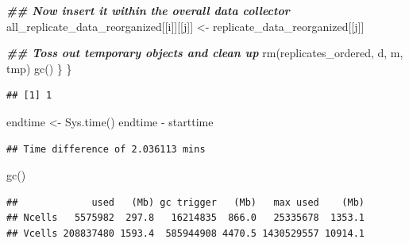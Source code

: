 \documentclass[
]{book}
\newenvironment{Shaded}{\begin{snugshade}}{\end{snugshade}}
\newcommand{\CommentTok}[1]{\textcolor[rgb]{0.56,0.35,0.01}{\textit{#1}}}
\newcommand{\ControlFlowTok}[1]{\textcolor[rgb]{0.13,0.29,0.53}{\textbf{#1}}}
\newcommand{\DecValTok}[1]{\textcolor[rgb]{0.00,0.00,0.81}{#1}}
\newcommand{\DocumentationTok}[1]{\textcolor[rgb]{0.56,0.35,0.01}{\textbf{\textit{#1}}}}
\newcommand{\FunctionTok}[1]{\textcolor[rgb]{0.00,0.00,0.00}{#1}}
\newcommand{\NormalTok}[1]{#1}
\newcommand{\OtherTok}[1]{\textcolor[rgb]{0.56,0.35,0.01}{#1}}
\newcommand{\SpecialCharTok}[1]{\textcolor[rgb]{0.00,0.00,0.00}{#1}}
\begin{document}
\begin{Shaded}
\begin{Highlighting}[]
    \DocumentationTok{\#\# Now insert it within the overall data collector}
\NormalTok{    all\_replicate\_data\_reorganized[[i]][[j]] }\OtherTok{\textless{}{-}}
\NormalTok{      replicate\_data\_reorganized[[j]]}

    \DocumentationTok{\#\# Toss out temporary objects and clean up}
    \FunctionTok{rm}\NormalTok{(replicates\_ordered, d, m, tmp)}
    \FunctionTok{gc}\NormalTok{()}
\NormalTok{  \}}
\NormalTok{\}}
\end{Highlighting}
\end{Shaded}

\begin{verbatim}
## [1] 1
\end{verbatim}

\begin{Shaded}
\begin{Highlighting}[]
\NormalTok{endtime }\OtherTok{\textless{}{-}} \FunctionTok{Sys.time}\NormalTok{()}
\NormalTok{endtime }\SpecialCharTok{{-}}\NormalTok{ starttime}
\end{Highlighting}
\end{Shaded}

\begin{verbatim}
## Time difference of 2.036113 mins
\end{verbatim}

\begin{Shaded}
\begin{Highlighting}[]
\FunctionTok{gc}\NormalTok{()}
\end{Highlighting}
\end{Shaded}

\begin{verbatim}
##             used   (Mb) gc trigger   (Mb)   max used    (Mb)
## Ncells   5575982  297.8   16214835  866.0   25335678  1353.1
## Vcells 208837480 1593.4  585944908 4470.5 1430529557 10914.1
\end{verbatim}

\begin{Shaded}
\end{Shaded}
\end{document}
